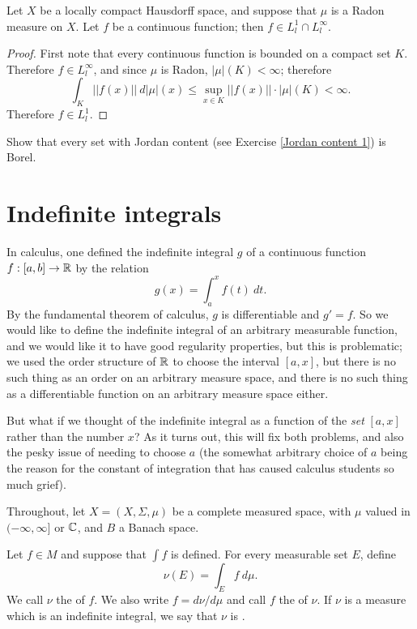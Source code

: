 \begin{lemma}
Let $X$ be a locally compact Hausdorff space, and suppose that $\mu$ is a Radon measure on $X$.
Let $f$ be a continuous function; then $f \in L^1_l \cap L^\infty_l$.
\end{lemma}
\begin{proof}
First note that every continuous function is bounded on a compact set $K$.
Therefore $f \in L^\infty_l$, and since $\mu$ is Radon, $|\mu|(K) < \infty$; therefore
$$\int_K ||f(x)||~d|\mu|(x) \leq \sup_{x \in K} ||f(x)||\cdot |\mu|(K) < \infty.$$
Therefore $f \in L^1_l$.
\end{proof}

\begin{exercise}
Show that every set with Jordan content (see Exercise \ref{Jordan content 1}) is Borel.
\end{exercise}

\section{Indefinite integrals}
In calculus, one defined the indefinite integral $g$ of a continuous function $f: [a, b] \to \mathbb{R}$ by the relation
$$g(x) = \int_a^x f(t)~dt.$$
By the fundamental theorem of calculus, $g$ is differentiable and $g' = f$.
So we would like to define the indefinite integral of an arbitrary measurable function, and we would like it to have good regularity properties, but this is problematic; we used the order structure of $\mathbb{R}$ to choose the interval $[a, x]$, but there is no such thing as an order on an arbitrary measure space, and there is no such thing as a differentiable function on an arbitrary measure space either.

But what if we thought of the indefinite integral as a function of the \emph{set} $[a, x]$ rather than the number $x$?
As it turns out, this will fix both problems, and also the pesky issue of needing to choose $a$ (the somewhat arbitrary choice of $a$ being the reason for the constant of integration that has caused calculus students so much grief).

\begin{subsec}
Throughout, let $X = (X, \Sigma, \mu)$ be a complete measured space, with $\mu$ valued in $(-\infty, \infty]$ or $\mathbb{C}$, and $B$ a Banach space.
\end{subsec}

\begin{definition}
Let $f \in M$ and suppose that $\int f$ is defined. For every measurable set $E$, define
$$\nu(E) = \int_E f~d\mu.$$
We call $\nu$ the  of $f$.
We also write $f = d\nu/d\mu$ and call $f$ the  of $\nu$.
If $\nu$ is a measure which is an indefinite integral, we say that $\nu$ is .
\end{definition}

